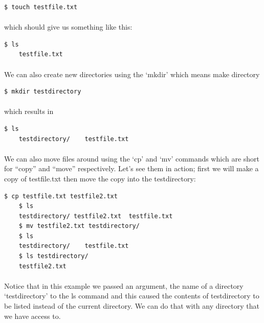 \documentclass[12pt, a4paper, oneside]{book}
\begin{document}
\begin{lstlisting}[style=DOS]
    $ touch testfile.txt
\end{lstlisting}

\paragraph{} which should give us something like this:

\begin{lstlisting}[style=DOS]
    $ ls
    testfile.txt
\end{lstlisting}

\paragraph{} We can also create new directories using the `mkdir' which means make directory
\begin{lstlisting}[style=DOS]
    $ mkdir testdirectory
\end{lstlisting}

\paragraph{} which results in

\begin{lstlisting}[style=DOS]
    $ ls
    testdirectory/    testfile.txt
\end{lstlisting}

\paragraph{} We can also move files around using the `cp' and `mv' commands which are short for ``copy'' and ``move'' respectively. Let's see them in action; first we will make a copy of testfile.txt then move the copy into the testdirectory:

\begin{lstlisting}[style=DOS]
    $ cp testfile.txt testfile2.txt
    $ ls
    testdirectory/ testfile2.txt  testfile.txt
    $ mv testfile2.txt testdirectory/
    $ ls
    testdirectory/    testfile.txt
    $ ls testdirectory/
    testfile2.txt
\end{lstlisting}

\paragraph{} Notice that in this example we passed an argument, the name of a directory `testdirectory' to the ls command and this caused the contents of testdirectory to be listed instead of the current directory. We can do that with any directory that we have access to.
\end{document}
